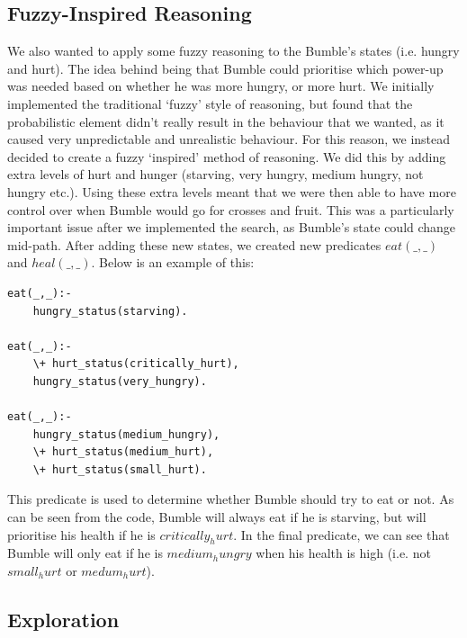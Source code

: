 \documentclass[a4paper,oneside]{report}
\begin{document}
\subsection{Fuzzy-Inspired Reasoning}

We also wanted to apply some fuzzy reasoning to the Bumble's states (i.e. hungry and hurt). The idea behind being that Bumble could prioritise which power-up was needed based on whether he was more hungry, or more hurt. We initially implemented the traditional `fuzzy' style of reasoning, but found that the probabilistic element didn't really result in the behaviour that we wanted, as it caused very unpredictable and unrealistic behaviour. For this reason, we instead decided to create a fuzzy `inspired' method of reasoning. We did this by adding extra levels of hurt and hunger (starving, very hungry, medium hungry, not hungry etc.). Using these extra levels meant that we were then able to have more control over when Bumble would go for crosses and fruit. This was a particularly important issue after we implemented the search, as Bumble's state could change mid-path. After adding these new states, we created new predicates $eat(\_,\_)$ and $heal(\_,\_)$. Below is an example of this:

\begin{verbatim}
eat(_,_):-
    hungry_status(starving).

eat(_,_):-
    \+ hurt_status(critically_hurt),
    hungry_status(very_hungry).

eat(_,_):-
    hungry_status(medium_hungry),
    \+ hurt_status(medium_hurt),
    \+ hurt_status(small_hurt).
\end{verbatim}
	
This predicate is used to determine whether Bumble should try to eat or not. As can be seen from the code, Bumble will always eat if he is starving, but will prioritise his health if he is $critically_hurt$. In the final predicate, we can see that Bumble will only eat if he is $medium_hungry$ when his health is high (i.e. not $small_hurt$ or $medum_hurt$).

\subsection{Exploration}
\end{document}
